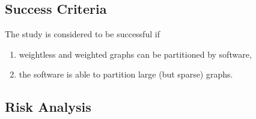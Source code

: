 \documentclass[a4paper,12pt]{report}
\begin{document}
\subsection{Success Criteria}

The study is considered to be successful if

\begin{enumerate}
\item weightless and weighted graphs can be partitioned by software,
\item the software is able to partition large (but sparse) graphs. 
\end{enumerate}

\subsection{Risk Analysis}
\end{document}
